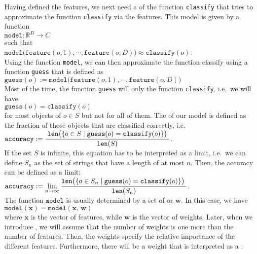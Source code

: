 Having defined the features, we next need a  of the function \texttt{classify} that tries to approximate the
function \texttt{classify} via the features.  This model is given by a function
\\[0.2cm]
\hspace*{1.3cm}
$\mathtt{model}: \mathbb{R}^D \rightarrow C$
\\[0.2cm]
such that
\\[0.2cm]
\hspace*{1.3cm}
$\mathtt{model}\bigl(\mathtt{feature}(o,1), \cdots, \mathtt{feature}(o,D)\bigr) \approx \mathtt{classify}(o)$.
\\[0.2cm]
Using the function \texttt{model}, we can then approximate the function classify using a function \texttt{guess} that is
defined as
\\[0.2cm]
\hspace*{1.3cm}
$\mathtt{guess}(o) := \mathtt{model}\bigl(\mathtt{feature}(o,1), \cdots, \mathtt{feature}(o,D)\bigr)$
\\[0.2cm]
Most of the time, the function \texttt{guess} will only  the function \texttt{classify}, i.e.~we will have
\\[0.2cm]
\hspace*{1.3cm}
$\mathtt{guess}(o) = \mathtt{classify}(o)$
\\[0.2cm]
for most objects of $o \in S$ but not for all of them.  The   of our model is
defined as the fraction of those objects that are classified correctly, i.e.~
\\[0.2cm]
\hspace*{1.3cm}
$\displaystyle \mathtt{accuracy} := \frac{\;\mathtt{len}\bigl( \{ o \in S \mid \mathtt{guess}(o) = \mathtt{classify}(o)\}\bigr)\;}{\mathtt{len}(S)}$.
\\[0.2cm]
If the set $S$ is infinite, this equation has to be interpreted as a limit, i.e.~we can define
$S_n$ as the set of strings that have a length of at most $n$.  Then, the accuracy can be defined as a limit:
\\[0.2cm]
\hspace*{1.3cm}
$\displaystyle \mathtt{accuracy} := \lim\limits_{n\rightarrow\infty}\frac{\mathtt{len}\bigl(\{ o \in S_n \mid \mathtt{guess}(o) = \mathtt{classify}(o)\}\bigr)\;}{\mathtt{len}(S_n)}$.
\\[0.2cm]
The function $\mathtt{model}$ is usually determined by a set of  or  $\mathbf{w}$. In
this case, we have
\\[0.2cm]
\hspace*{1.3cm}
$\mathtt{model}(\mathbf{x}) = \mathtt{model}(\mathbf{x},\,\mathbf{w})$
\\[0.2cm]
where $\mathbf{x}$ is the vector of features, while $\mathbf{w}$ is the vector of weights.  Later, when we
introduce , we will assume that the number of weights is one more than the number of
features.  Then, the weights specify the relative importance of the different features. Furthermore, there will
be a weight that is interpreted as a . 

